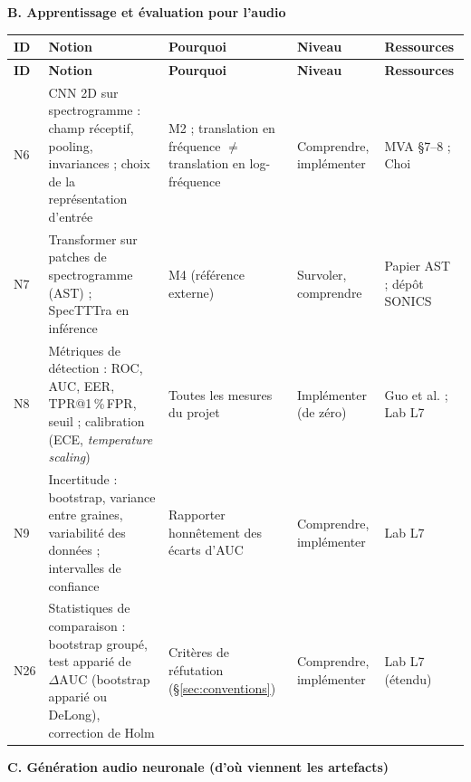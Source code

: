 \documentclass[11pt,a4paper]{article}
\makeatletter
\newcommand{\AUC}{\textrm{AUC}}
\newcommand{\tprfpr}{TPR@1\,\%\,FPR}
\makeatother
\begin{document}
\textbf{B. Apprentissage et évaluation pour l'audio}

{\small
\begin{longtable}{L{0.9cm}L{3.7cm}L{4.6cm}L{2.3cm}L{3.1cm}}
\toprule
\textbf{ID} & \textbf{Notion} & \textbf{Pourquoi} & \textbf{Niveau} & \textbf{Ressources}\\
\midrule
\endfirsthead
\toprule
\textbf{ID} & \textbf{Notion} & \textbf{Pourquoi} & \textbf{Niveau} & \textbf{Ressources}\\
\midrule
\endhead
\bottomrule
\endfoot
N6 & CNN 2D sur spectrogramme : champ réceptif, pooling, invariances ; choix de la représentation d'entrée & M2 ; translation en fréquence $\neq$ translation en log-fréquence & Comprendre, implémenter & MVA \S7--8 ; Choi\\
N7 & Transformer sur patches de spectrogramme (AST) ; SpecTTTra en inférence & M4 (référence externe) & Survoler, comprendre & Papier AST ; dépôt SONICS\\
N8 & Métriques de détection : ROC, AUC, EER, \tprfpr, seuil ; calibration (ECE, \emph{temperature scaling}) & Toutes les mesures du projet & Implémenter (de zéro) & Guo et al. ; Lab L7\\
N9 & Incertitude : bootstrap, variance entre graines, variabilité des données ; intervalles de confiance & Rapporter honnêtement des écarts d'AUC & Comprendre, implémenter & Lab L7\\
N26 & Statistiques de comparaison : bootstrap groupé, test apparié de $\Delta\AUC$ (bootstrap apparié ou DeLong), correction de Holm & Critères de réfutation (\S\ref{sec:conventions}) & Comprendre, implémenter & Lab L7 (étendu)\\
\end{longtable}
}

\textbf{C. Génération audio neuronale (d'où viennent les artefacts)}
\end{document}
